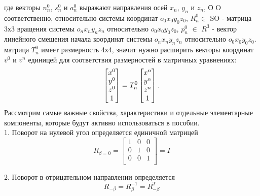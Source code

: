 \hspace*{\parindent} где векторы  $n_n^0$,  $s_n^0$ и $a_n^0$ выражают направления осей $x_n$, $y_n$ и $z_n$, О O соответственно, относительно системы координат $o_0 x_0 y_0 z_0$, $R_n^0 \in$ SO - матрица 3х3 вращения системы  $o_n x_n y_n z_n$ относительно $o_0 x_0 y_0 z_0$, $p_n^0$ $\in$ $R^3$ - вектор линейного смещения начала координат системы  $o_n x_n y_n z_n$ относительно $o_0 x_0 y_0 z_0$.\\
\hspace*{\parindent} матрица $T_n^0$ имеет размерность 4х4, значит нужно расширить векторы координат $v^0$ и $v^n$ единицей для соответствия размерностей в матричных уравнениях:\\
\begin{equation*}\label{eq:model}
     \begin{bmatrix}
     x^0 \\
     y^0\\
     z^0\\
     1\\
    \end{bmatrix}
     =T_n^0
     \begin{bmatrix}
     x^n \\
     y^n\\
     z^n\\
     1\\
    \end{bmatrix}
    .\\
\end{equation*} 
\hspace*{\parindent} Рассмотрим самые важные свойства, характеристики и отдельные элементарные компоненты, которые будут активно использоваться в пособии.\\

1. Поворот на нулевой угол определяется единичной матрицей\\
\begin{equation*}\label{eq:model}
R_{\beta=0} = 
     \begin{bmatrix}
    1 & 0 & 0\\
    0 & 1 & 0\\
    0 & 0 & 1\\
    \end{bmatrix}
     =I
\end{equation*} 

2. Поворот в отрицательном направлении определяется
\begin{equation*}\label{eq:model}
R_{-\beta} = R_{\beta}^{-1} = R_{-\beta}^T
\end{equation*} 

